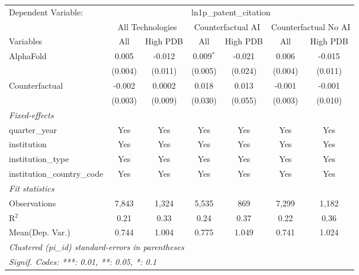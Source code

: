\begingroup
\centering
\begin{tabular}{lcccccc}
   \tabularnewline \midrule \midrule
   Dependent Variable: & \multicolumn{6}{c}{ln1p\_patent\_citation}\\
 & \multicolumn{2}{c}{All Technologies} & \multicolumn{2}{c}{Counterfactual AI} & \multicolumn{2}{c}{Counterfactual No AI} \\
\cmidrule(lr){1-1}\cmidrule(lr){2-3} \cmidrule(lr){4-5} \cmidrule(lr){6-7}
Variables & \multicolumn{1}{c}{All} & \multicolumn{1}{c}{High PDB} & \multicolumn{1}{c}{All} & \multicolumn{1}{c}{High PDB} & \multicolumn{1}{c}{All} & \multicolumn{1}{c}{High PDB} \\
\cmidrule(lr){1-1}\cmidrule(lr){2-2} \cmidrule(lr){3-3} \cmidrule(lr){4-4} \cmidrule(lr){5-5} \cmidrule(lr){6-6} \cmidrule(lr){7-7}
   AlphaFold                    & 0.005   & -0.012  & 0.009$^{*}$ & -0.021  & 0.006   & -0.015\\   
                                & (0.004) & (0.011) & (0.005)     & (0.024) & (0.004) & (0.011)\\   
   Counterfactual               & -0.002  & 0.0002  & 0.018       & 0.013   & -0.001  & -0.001\\   
                                & (0.003) & (0.009) & (0.030)     & (0.055) & (0.003) & (0.010)\\   
   \midrule
   \emph{Fixed-effects}\\
   quarter\_year                & Yes     & Yes     & Yes         & Yes     & Yes     & Yes\\  
   institution                  & Yes     & Yes     & Yes         & Yes     & Yes     & Yes\\  
   institution\_type            & Yes     & Yes     & Yes         & Yes     & Yes     & Yes\\  
   institution\_country\_code   & Yes     & Yes     & Yes         & Yes     & Yes     & Yes\\  
   \midrule
   \emph{Fit statistics}\\
   Observations                 & 7,843   & 1,324   & 5,535       & 869     & 7,299   & 1,182\\  
   R$^2$                        & 0.21    & 0.33    & 0.24        & 0.37    & 0.22    & 0.36\\  
Mean(Dep. Var.) & 0.744 & 1.004 & 0.775 & 1.049 & 0.741 & 1.024 \\
   \midrule \midrule
   \multicolumn{7}{l}{\emph{Clustered (pi\_id) standard-errors in parentheses}}\\
   \multicolumn{7}{l}{\emph{Signif. Codes: ***: 0.01, **: 0.05, *: 0.1}}\\
\end{tabular}
\par\endgroup
